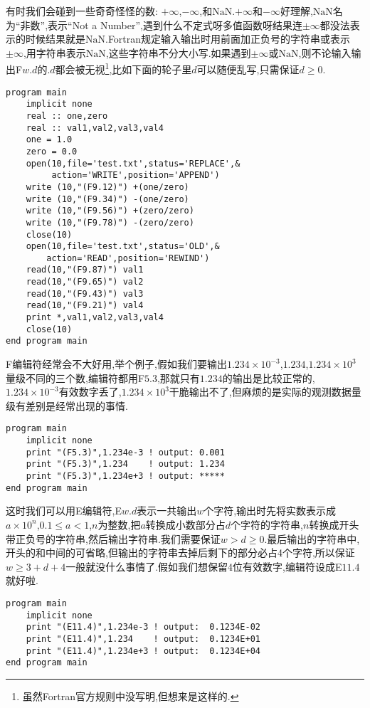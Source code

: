 有时我们会碰到一些奇奇怪怪的数: $+\infty$,$-\infty$,和$\text{NaN}$.$+\infty$和$-\infty$好理解,$\text{NaN}$名为``非数'',表示``Not a Number'',遇到什么不定式呀多值函数呀结果连$\pm\infty$都没法表示的时候结果就是$\text{NaN}$.Fortran规定输入输出时用前面加正负号的字符串或表示$\pm\infty$,用字符串表示$\text{NaN}$,这些字符串不分大小写.如果遇到$\pm\infty$或$\text{NaN}$,则不论输入输出F$w.d$的$.d$都会被无视\footnote{虽然Fortran官方规则中没写明,但想来是这样的.\label{edit_IEEE}},比如下面的轮子里$d$可以随便乱写,只需保证$d\geqslant0$.
\begin{lstlisting}
program main
    implicit none
    real :: one,zero
    real :: val1,val2,val3,val4
    one = 1.0
    zero = 0.0
    open(10,file='test.txt',status='REPLACE',&
         action='WRITE',position='APPEND')
    write (10,"(F9.12)") +(one/zero)
    write (10,"(F9.34)") -(one/zero)
    write (10,"(F9.56)") +(zero/zero)
    write (10,"(F9.78)") -(zero/zero)
    close(10)
    open(10,file='test.txt',status='OLD',&
        action='READ',position='REWIND')
    read(10,"(F9.87)") val1
    read(10,"(F9.65)") val2
    read(10,"(F9.43)") val3
    read(10,"(F9.21)") val4
    print *,val1,val2,val3,val4
    close(10)
end program main
\end{lstlisting}

F编辑符经常会不大好用,举个例子,假如我们要输出$1.234\times10^{-3}$,$1.234$,$1.234\times10^{3}$量级不同的三个数,编辑符都用F$5.3$,那就只有$1.234$的输出是比较正常的,$1.234\times10^{-3}$有效数字丢了,$1.234\times10^{3}$干脆输出不了,但麻烦的是实际的观测数据量级有差别是经常出现的事情.
\begin{lstlisting}
program main
    implicit none
    print "(F5.3)",1.234e-3 ! output: 0.001
    print "(F5.3)",1.234    ! output: 1.234
    print "(F5.3)",1.234e+3 ! output: *****
end program main
\end{lstlisting}
这时我们可以用E编辑符,E$w.d$表示一共输出$w$个字符,输出时先将实数表示成$a\times10^{n}$,$0.1\leqslant a<1$,$n$为整数,把$a$转换成小数部分占$d$个字符的字符串,$n$转换成开头带正负号的字符串,然后输出字符串.我们需要保证$w>d\geqslant0$.最后输出的字符串中,开头的和中间的可省略,但输出的字符串去掉后剩下的部分必占4个字符,所以保证$w\geqslant 3+d+4$一般就没什么事情了.假如我们想保留4位有效数字,编辑符设成E$11.4$就好啦.
\begin{lstlisting}
program main
    implicit none
    print "(E11.4)",1.234e-3 ! output:  0.1234E-02
    print "(E11.4)",1.234    ! output:  0.1234E+01
    print "(E11.4)",1.234e+3 ! output:  0.1234E+04
end program main
\end{lstlisting}

